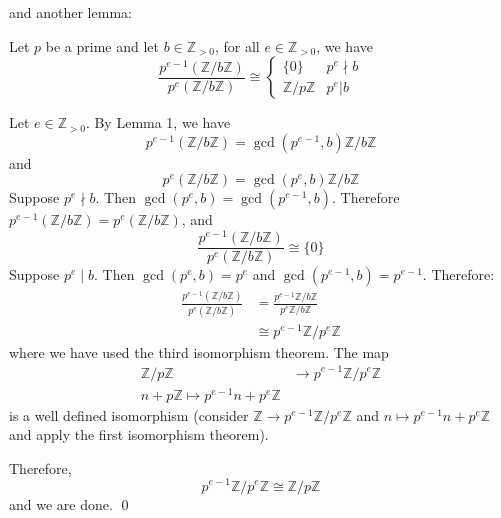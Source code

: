 \documentclass{article}
\renewenvironment{proof}{{\bfseries\color{blue1} Proof:}}{\qed}
\begin{document}
and another lemma:
\begin{idea}
    Let $p$ be a prime and let $b\in \mathbb{Z}_{>0}$, for all $e\in \mathbb{Z}_{>0}$, we have
    \begin{equation*}
        \frac{p^{e-1}(\mathbb{Z}/b\mathbb{Z})}{p^e(\mathbb{Z}/b\mathbb{Z})} \cong \begin{cases}
            \{0\}                  & p^e \nmid b \\
            \mathbb{Z}/p\mathbb{Z} & p^e | b
        \end{cases}
    \end{equation*}
\end{idea}
\begin{proof}
    Let $e\in \mathbb{Z}_{>0}$. By Lemma 1, we have
    \begin{equation*}
        p^{e-1}(\mathbb{Z}/b\mathbb{Z}) = \gcd(p^{e-1},b)\mathbb{Z}/b\mathbb{Z}
    \end{equation*}
    and
    \begin{equation*}
        p^e(\mathbb{Z}/b\mathbb{Z}) = \gcd(p^e,b)\mathbb{Z}/b\mathbb{Z}
    \end{equation*}
    Suppose $p^e \nmid b$. Then $\gcd(p^e,b)=\gcd(p^{e-1},b)$. Therefore $p^{e-1}(\mathbb{Z}/b\mathbb{Z})=p^e(\mathbb{Z}/b\mathbb{Z})$, and
    \begin{equation*}
        \frac{p^{e-1}(\mathbb{Z}/b\mathbb{Z})}{p^e(\mathbb{Z}/b\mathbb{Z})} \cong \{0\}
    \end{equation*}
    Suppose $p^e \mid b$. Then $\gcd(p^e,b)=p^e$ and $\gcd(p^{e-1},b)=p^{e-1}$. Therefore:
    \begin{align*}
        \frac{p^{e-1}(\mathbb{Z}/b\mathbb{Z})}{p^e(\mathbb{Z}/b\mathbb{Z})} & = \frac{p^{e-1}\mathbb{Z}/b\mathbb{Z}}{p^e\mathbb{Z}/b\mathbb{Z}} \\
                                                                            & \cong p^{e-1}\mathbb{Z}/p^e\mathbb{Z}
    \end{align*}
    where we have used the third isomorphism theorem. The map
    \begin{align*}
        \mathbb{Z}/p\mathbb{Z} & \rightarrow p^{e-1}\mathbb{Z}/p^e\mathbb{Z} \\
        n+p\mathbb{Z} \mapsto p^{e-1}n+p^e\mathbb{Z}
    \end{align*}
    is a well defined isomorphism (consider $\mathbb{Z} \rightarrow p^{e-1}\mathbb{Z}/p^e\mathbb{Z}$ and $n \mapsto p^{e-1}n+p^e\mathbb{Z}$ and apply the first isomorphism theorem).

    Therefore,
    \begin{equation*}
        p^{e-1}\mathbb{Z}/p^e\mathbb{Z}  \cong \mathbb{Z}/p\mathbb{Z}
    \end{equation*}
    and we are done.
\end{proof}
\end{document}
